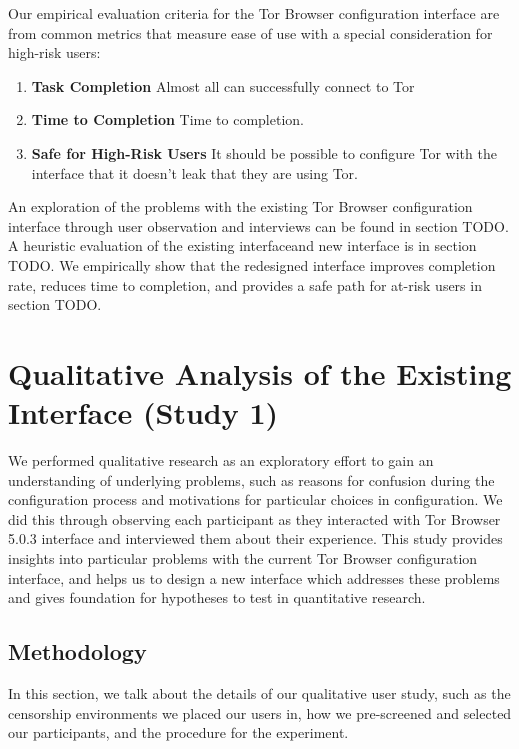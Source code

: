 \documentclass{template}
\begin{document}
Our empirical evaluation criteria for the Tor Browser configuration
interface are from common metrics that measure ease of use with a special 
consideration for high-risk users: 
\begin{enumerate} \itemsep1pt \parskip0pt 
    \item {\bfseries Task Completion} Almost all can successfully connect to Tor
    \item {\bfseries Time to Completion} Time to completion. 
    \item {\bfseries Safe for High-Risk Users} It should be possible to configure Tor with the interface that it doesn't leak that they are using Tor. 
\end{enumerate}

An exploration of the problems with the existing Tor Browser 
configuration interface through user observation and interviews can be 
found in section {\color{red} TODO}. A heuristic evaluation of the existing interfaceand new interface is in section {\color{red} TODO}. We empirically show 
that the redesigned interface improves completion rate, reduces time to completion, 
and provides a safe path for at-risk users in section {\color{red} TODO}. 

\section{Qualitative Analysis of the Existing Interface (Study 1)}
We performed qualitative research as an exploratory effort to gain an 
understanding of underlying problems, such as reasons for confusion 
during the configuration process and motivations for particular choices in 
configuration. We did this through observing each participant as they 
interacted with Tor Browser 5.0.3 interface and interviewed them about
their experience. This study provides insights into particular problems with 
the current Tor Browser configuration interface, and helps us to design
a new interface which addresses these problems and gives foundation
for hypotheses to test in quantitative research. 

\subsection{Methodology} 
In this section, we talk about the details of our qualitative user study, such as the censorship environments we placed our users in, how we pre-screened and selected our participants, and the procedure for the experiment. 
\end{document}
